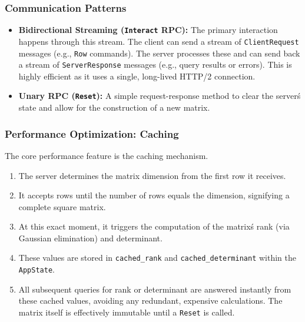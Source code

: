 \documentclass{article}
\begin{document}
\subsubsection{Communication Patterns}
\begin{itemize}
    \item \textbf{Bidirectional Streaming (\texttt{Interact} RPC):} The primary interaction happens through this stream. The client can send a stream of \texttt{ClientRequest} messages (e.g., \texttt{Row} commands). The server processes these and can send back a stream of \texttt{ServerResponse} messages (e.g., query results or errors). This is highly efficient as it uses a single, long-lived HTTP/2 connection.
    \item \textbf{Unary RPC (\texttt{Reset}):} A simple request-response method to clear the server\'s state and allow for the construction of a new matrix.
\end{itemize}

\subsubsection{Performance Optimization: Caching}
The core performance feature is the caching mechanism.
\begin{enumerate}
    \item The server determines the matrix dimension from the first row it receives.
    \item It accepts rows until the number of rows equals the dimension, signifying a complete square matrix.
    \item At this exact moment, it triggers the computation of the matrix\'s rank (via Gaussian elimination) and determinant.
    \item These values are stored in \texttt{cached\_rank} and \texttt{cached\_determinant} within the \texttt{AppState}.
    \item All subsequent queries for rank or determinant are answered instantly from these cached values, avoiding any redundant, expensive calculations. The matrix itself is effectively immutable until a \texttt{Reset} is called.
\end{enumerate}
\end{document}
